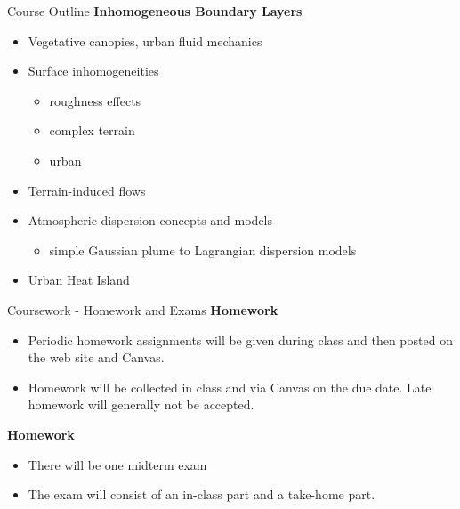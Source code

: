 
\begin{frame}{Course Outline}
\textbf{Inhomogeneous Boundary Layers}
\begin{itemize}
\item Vegetative canopies, urban fluid mechanics
\item Surface inhomogeneities
	\begin{itemize}
		\item roughness effects
		\item complex terrain
		\item urban
	\end{itemize}
\item Terrain-induced flows
\item Atmospheric dispersion concepts and models
\begin{itemize}
	\item simple Gaussian plume to Lagrangian dispersion models
\end{itemize}
\item Urban Heat Island
\end{itemize}

\end{frame}


\begin{frame}{Coursework - Homework and Exams}
\textbf{Homework}
\begin{itemize}
	\item Periodic homework assignments will be given during class and then posted on the web site and Canvas.  
	\item Homework will be collected in class and via Canvas on the due date. Late homework will generally not be accepted.
\end{itemize}

\textbf{Homework}
\begin{itemize}
	\item There will be one midterm exam
	\item The exam will consist of an in-class part and a take-home part.
\end{itemize}
\end{frame}


